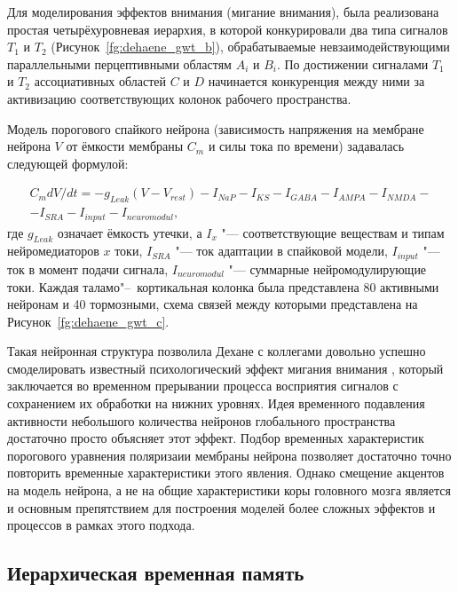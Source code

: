 Для моделирования эффектов внимания (мигание внимания), была реализована простая четырёхуровневая иерархия, в которой конкурировали два типа сигналов $T_1$ и $T_2$ (Рисунок~\ref{fg:dehaene_gwt_b}), обрабатываемые невзаимодействующими параллельными перцептивными областям $A_i$ и $B_i$. По достижении сигналами $T_1$ и $T_2$ ассоциативных областей $C$ и $D$ начинается конкуренция между ними за активизацию соответствующих колонок рабочего пространства.

Модель порогового спайкого нейрона (зависимость напряжения на мембране нейрона $V$ от ёмкости мембраны $C_m$ и силы тока по времени) задавалась следующей формулой:

\begin{equation}
	\begin{split}
		C_mdV/dt=-g_{Leak}(V-V_{rest})-I_{NaP}-I_{KS}-I_{GABA}-I_{AMPA}-I_{NMDA}-\\
		-I_{SRA}-I_{input}-I_{neuromodul},
	\end{split}
\end{equation}
где $g_{Leak}$ означает ёмкость утечки, а $I_x$ "--- соответствующие веществам и типам нейромедиаторов $x$ токи, $I_{SRA}$ "--- ток адаптации в спайковой модели, $I_{input}$ "--- ток в момент подачи сигнала, $I_{neuromodul}$ "--- суммарные нейромодулирующие токи. Каждая таламо"--~кортикальная колонка была представлена 80 активными нейронам и 40 тормозными, схема связей между которыми представлена на Рисунок~\ref{fg:dehaene_gwt_c}.

Такая нейронная структура позволила Дехане с коллегами довольно успешно смоделировать известный психологический эффект мигания внимания \cite{Raymond1992}, который заключается во временном прерывании процесса восприятия сигналов с сохранением их обработки на нижних уровнях. Идея временного подавления активности небольшого количества нейронов глобального пространства достаточно просто объясняет этот эффект. Подбор временных характеристик порогового уравнения поляризаии мембраны нейрона позволяет достаточно точно повторить временные характеристики этого явления. Однако смещение акцентов на модель нейрона, а не на общие характеристики коры головного мозга является и основным препятствием для построения моделей более сложных эффектов и процессов в рамках этого подхода.

\subsection{Иерархическая временная память}

